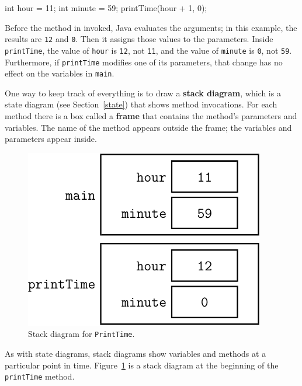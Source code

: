 \documentclass[12pt]{book}
\theoremstyle{exercise}
\newcommand{\java}[1]{\verb"#1"}
\newcommand{\java}[1]{\lstinline{#1}} %
\begin{document}
\begin{code}
        int hour = 11;
        int minute = 59;
        printTime(hour + 1, 0);
\end{code}

Before the method in invoked, Java evaluates the arguments; in this example, the results are \java{12} and \java{0}.
Then it assigns those values to the parameters.
Inside \java{printTime}, the value of \java{hour} is \java{12}, not \java{11}, and the value of \java{minute} is \java{0}, not \java{59}.
Furthermore, if \java{printTime} modifies one of its parameters, that change has no effect on the variables in \java{main}.


One way to keep track of everything is to draw a {\bf stack diagram}, which is a state diagram (see Section~\ref{state}) that shows method invocations.
For each method there is a box called a {\bf frame} that contains the method's parameters and variables.
The name of the method appears outside the frame; the variables and parameters appear inside.

\begin{figure}[!h]
\begin{center}
\includegraphics[scale=0.9]{figs/stack.pdf}
\caption{Stack diagram for \java{PrintTime}.}
\label{fig:stack}
\end{center}
\end{figure}

As with state diagrams, stack diagrams show variables and methods at a particular point in time.
Figure~\ref{fig:stack} is a stack diagram at the beginning of the \java{printTime} method.


\end{document}

